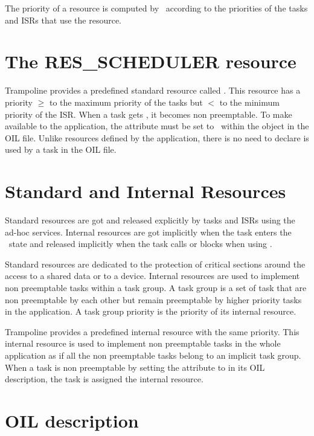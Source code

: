 The priority of a resource is computed by \goil\ according to the priorities of the tasks and ISRs that use the resource.

\section{The {\ttfamily RES_SCHEDULER} resource}

Trampoline provides a predefined standard resource called . This resource has a priority $\ge$ to the maximum priority of the tasks but $<$ to the minimum priority of the ISR. When a task gets , it becomes non preemptable. To make  available to the application, the  attribute must be set to \TRUE\ within the  object in the OIL file. Unlike resources defined by the application, there is no need to declare  is used by a task in the OIL file.

\section{Standard and Internal Resources}

Standard resources are got and released explicitly by tasks and ISRs using the ad-hoc services. Internal resources are got implicitly when the task enters the \RUNNING\ state and released implicitly when the task calls  or blocks when using .

Standard resources are dedicated to the protection of critical sections around the access to a shared data or to a device. Internal resources are used to implement non preemptable tasks within a task group.
A task group is a set of task that are non preemptable by each other but remain preemptable by higher priority tasks in the application. A task group priority is the priority of its internal resource.

Trampoline provides a predefined internal  resource with the same priority. This internal resource is used to implement non preemptable tasks in the whole application as if all the non preemptable tasks belong to an implicit task group. When a task is non preemptable by setting the  attribute to  in its OIL description, the task is assigned the internal  resource.

\section{OIL description}


